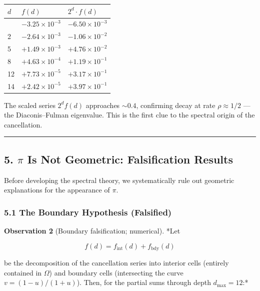 \documentclass[
  11pt,
]{article}
\begin{document}
\begin{longtable}[]{@{}lll@{}}
\toprule\noalign{}
\(d\) & \(f(d)\) & \(2^d \cdot f(d)\) \\
\midrule\noalign{}
\endhead
\bottomrule\noalign{}
\endlastfoot
1 & \(-3.25 \times 10^{-3}\) & \(-6.50 \times 10^{-3}\) \\
2 & \(-2.64 \times 10^{-3}\) & \(-1.06 \times 10^{-2}\) \\
5 & \(+1.49 \times 10^{-3}\) & \(+4.76 \times 10^{-2}\) \\
8 & \(+4.63 \times 10^{-4}\) & \(+1.19 \times 10^{-1}\) \\
12 & \(+7.73 \times 10^{-5}\) & \(+3.17 \times 10^{-1}\) \\
14 & \(+2.42 \times 10^{-5}\) & \(+3.97 \times 10^{-1}\) \\
\end{longtable}

The scaled series \(2^d f(d)\) approaches \(\sim 0.4\), confirming decay at rate
\(\rho \approx 1/2\) --- the Diaconis--Fulman eigenvalue. This is the first clue
to the spectral origin of the cancellation.

\begin{center}\rule{0.5\linewidth}{0.5pt}\end{center}

\newpage

\subsection{\texorpdfstring{5. \(\pi\) Is Not Geometric: Falsification
Results}{5. \textbackslash pi Is Not Geometric: Falsification Results}}\label{pi-is-not-geometric-falsification-results}

Before developing the spectral theory, we systematically rule out geometric
explanations for the appearance of \(\pi\).

\subsubsection{5.1 The Boundary Hypothesis
(Falsified)}\label{the-boundary-hypothesis-falsified}

\textbf{Observation 2} (Boundary falsification; numerical). *Let

\[f(d) = f_{\mathrm{int}}(d) + f_{\mathrm{bdy}}(d)\]

be the decomposition of the cancellation series into interior cells (entirely
contained in \(\Omega\)) and boundary cells (intersecting the curve
\(v = (1-u)/(1+u)\)). Then, for the partial sums through depth
\(d_{\max} = 12\):*
\end{document}
